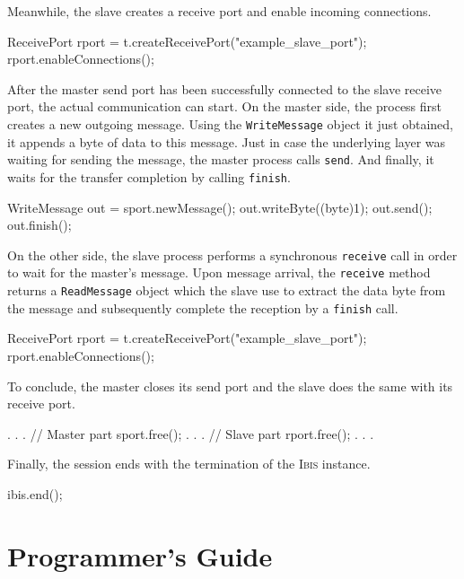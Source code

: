 \documentclass[11pt]{book}
\def\Ibis{\textsc{Ibis}\xspace}
\begin{document}
Meanwhile, the slave creates a receive port and enable incoming
connections.
\begin{Miniverb}
        ReceivePort rport = t.createReceivePort("example_slave_port");
        rport.enableConnections();
\end{Miniverb}

After the master send port has been successfully connected to the
slave receive port, the actual communication can start. On the master
side, the process first creates a new outgoing message. Using the
\texttt{WriteMessage} object it just obtained, it appends a byte of
data to this message. Just in case the underlying layer was waiting
for sending the message, the master process calls \texttt{send}. And
finally, it waits for the transfer completion by calling
\texttt{finish}.
\begin{Miniverb}
        WriteMessage out = sport.newMessage();
        out.writeByte((byte)1);
        out.send();
        out.finish();
\end{Miniverb}

On the other side, the slave process performs a synchronous
\texttt{receive} call in order to wait for the master's message. Upon
message arrival, the \texttt{receive} method returns a
\texttt{ReadMessage} object which the slave use to extract the data
byte from the message and subsequently complete the reception by a
\texttt{finish} call.
\begin{Miniverb}
        ReceivePort rport = t.createReceivePort("example_slave_port");
        rport.enableConnections();
\end{Miniverb}

To conclude, the master closes its send port and the slave does the
same with its receive port.
\begin{Miniverb}
    . . .
        // Master part
        sport.free();
    . . .
        // Slave  part
        rport.free();
    . . .
\end{Miniverb}

Finally, the session ends with the termination of the \Ibis instance.
\begin{Miniverb}
      ibis.end();
\end{Miniverb}


\chapter{Programmer's Guide}
\label{cha:programmers-guide}
\end{document}
